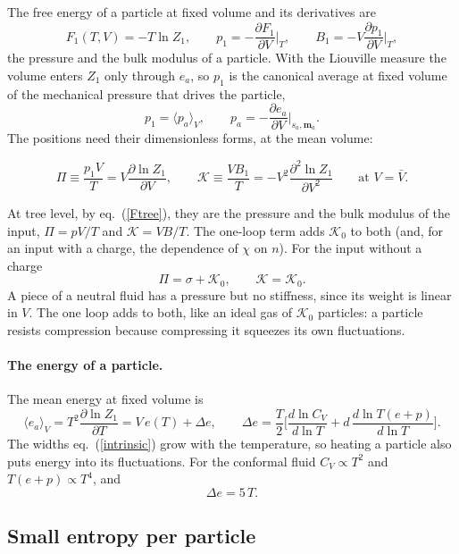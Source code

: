 \documentclass[11pt,aps,preprint,nofootinbib,superscriptaddress,tightenlines]{revtex4-2}
\newcommand{\avg}[1]{\langle #1\rangle}
\def\st{\begin{equation}}
\def\stp{\end{equation}}
\def\Eq#1{eq.~(\ref{#1})}
\let\oldparagraph\paragraph
\renewcommand{\paragraph}{\par\bigskip\oldparagraph}
\begin{document}
The free energy of a particle at fixed volume and its derivatives are
\st
F_1(T,V)=-T\ln Z_1,\qquad p_1=-\frac{\partial F_1}{\partial V}\Big|_T,\qquad B_1=-V\frac{\partial p_1}{\partial V}\Big|_T,
\stp
the pressure and the bulk modulus of a particle.  With the Liouville measure the volume enters $Z_1$ only through $e_a$, so $p_1$ is the canonical average
at fixed volume of the mechanical pressure that drives the particle,
\st
p_1=\avg{p_a}_V,\qquad p_a=-\frac{\partial e_a}{\partial V}\Big|_{s_a,\bm m_a} .
\stp
The positions need their dimensionless forms, at the mean volume:
\begin{keyeq}
\st
\Pi\equiv\frac{p_1V}T=V\frac{\partial\ln Z_1}{\partial V},\qquad
\mathcal K\equiv\frac{VB_1}T=-V^2\frac{\partial^2\ln Z_1}{\partial V^2}\qquad\text{at }V=\bar V .
\label{PiK}
\stp
\end{keyeq}
At tree level, by \Eq{Ftree}, they are the pressure and the bulk modulus of the input, $\Pi=pV/T$ and $\mathcal K=VB/T$.  The one-loop term adds
$\mathcal K_0$ to both (and, for an input with a charge, the dependence of $\chi$ on $n$).  For the input without a charge
\st
\Pi=\sigma+\mathcal K_0,\qquad \mathcal K=\mathcal K_0 .
\label{PiKloop}
\stp
A piece of a neutral fluid has a pressure but no stiffness, since its weight is linear in $V$.  The one loop adds to both, like an ideal gas of $\mathcal K_0$
particles: a particle resists compression because compressing it squeezes its own fluctuations.

\paragraph{The energy of a particle.}  The mean energy at fixed volume is
\st
\avg{e_a}_V=T^2\frac{\partial\ln Z_1}{\partial T}=V\,e(T)+\Delta e,\qquad
\Delta e=\frac T2\Big[\frac{d\ln C_V}{d\ln T}+d\,\frac{d\ln T(e+p)}{d\ln T}\Big] .
\label{Deltae}
\stp
The widths \Eq{intrinsic} grow with the temperature, so heating a particle also puts energy into its fluctuations.  For the conformal fluid
$C_V\propto T^2$ and $T(e+p)\propto T^4$, and
\st
\Delta e=5\,T .
\stp

\subsection{Small entropy per particle}
\label{sec:quadrature}
\end{document}
